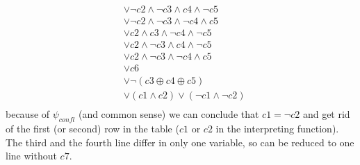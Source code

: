 \documentclass{scrartcl}
\begin{document}
\begin{itemize}
\begin{align*}
	&\lor ¬c2 \land ¬c3 \land c4 \land ¬c5 \\
	&\lor ¬c2 \land ¬c3 \land ¬c4 \land c5 \\
	&\lor c2 \land c3 \land ¬c4 \land ¬c5 \\
	&\lor c2 \land ¬c3 \land c4 \land ¬c5 \\
	&\lor c2 \land ¬c3 \land ¬c4 \land c5 \\
	&\lor c6\\
	&\lor ¬(c3 \oplus c4 \oplus c5)\\
	&\lor (c1 \land c2 )\lor(¬c1 \land ¬c2)\\
    \end{align*}
    because of $\psi_{confl}$ (and common sense) we can conclude that $c1 = ¬c2$ and get rid of the first (or second) row in the table ($c1$ or $c2$ in the interpreting function). The third and the fourth line differ in only one variable, so can be reduced to one line without $c7$.
\end{itemize}
\end{document}
